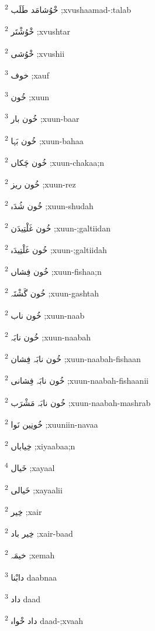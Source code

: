 \documentclass[12pt]{article}
\begin{document}
\begin{multicols}{5}
{\ur خْوُشامَد طَلَب}   \textsuperscript{2} ;xvushaamad-:talab

{\ur خْوُشْتَر}   \textsuperscript{2} ;xvushtar

{\ur خْوُشی}   \textsuperscript{2} ;xvushii

{\ur خوف}   \textsuperscript{3} ;xauf

{\ur خُون}   \textsuperscript{3} ;xuun

{\ur خُون بار}   \textsuperscript{3} ;xuun-baar

{\ur خُون بَہا}   \textsuperscript{2} ;xuun-bahaa

{\ur خُون چَکاں}   \textsuperscript{2} ;xuun-chakaa;n

{\ur خُون ریز}   \textsuperscript{2} ;xuun-rez

{\ur خُون شُدَہ}   \textsuperscript{2} ;xuun-shudah

{\ur خُون غَلْتِیدَن}   \textsuperscript{2} ;xuun-;galtiidan

{\ur خُون غَلْتِیدَہ}   \textsuperscript{2} ;xuun-;galtiidah

{\ur خُون فِشاں}   \textsuperscript{2} ;xuun-fishaa;n

{\ur خُون گَشْتَہ}   \textsuperscript{2} ;xuun-gashtah

{\ur خُون ناب}   \textsuperscript{2} ;xuun-naab

{\ur خُون نابَہ}   \textsuperscript{2} ;xuun-naabah

{\ur خُون نابَہ فِشان}   \textsuperscript{2} ;xuun-naabah-fishaan

{\ur خُون نابَہ فِشانی}   \textsuperscript{2} ;xuun-naabah-fishaanii

{\ur خُون نابَہ مَشْرَب}   \textsuperscript{2} ;xuun-naabah-mashrab

{\ur خُونِین نَوا}   \textsuperscript{2} ;xuuniin-navaa

{\ur خِیاباں}   \textsuperscript{2} ;xiyaabaa;n

{\ur خَیال}   \textsuperscript{4} ;xayaal

{\ur خَیالی}   \textsuperscript{2} ;xayaalii

{\ur خِیر}   \textsuperscript{2} ;xair

{\ur خِیر باد}   \textsuperscript{2} ;xair-baad

{\ur خیمَہ}   \textsuperscript{2} ;xemah

{\ur دابْنا}   \textsuperscript{3} daabnaa

{\ur داد}   \textsuperscript{3} daad

{\ur داد خْواہ}   \textsuperscript{2} daad-;xvaah


\end{multicols}
\end{document}

